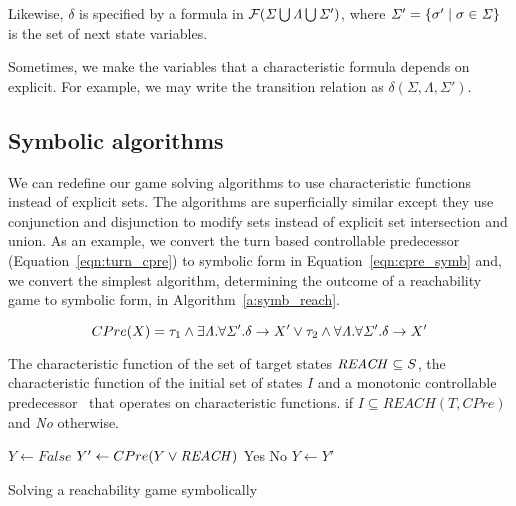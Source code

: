Likewise, $\delta$ is specified by a formula in $\mathcal{F}(\mathit{\Sigma} \bigcup \mathit{\Lambda} \bigcup \mathit{\Sigma}')$, where $\mathit{\Sigma}' = \{\sigma' \mid \sigma \in \mathit{\Sigma} \}$ is the set of next state variables.

Sometimes, we make the variables that a characteristic formula depends on explicit. For example, we may write the transition relation as $\delta(\Sigma, \Lambda, \Sigma')$.

\subsection{Symbolic algorithms}

We can redefine our game solving algorithms to use characteristic functions instead of explicit sets. The algorithms are superficially similar except they use conjunction and disjunction to modify sets instead of explicit set intersection and union. As an example, we convert the turn based controllable predecessor (Equation~\ref{eqn:turn_cpre}) to symbolic form in Equation~\ref{eqn:cpre_symb} and, we convert the simplest algorithm, determining the outcome of a reachability game to symbolic form, in Algorithm~\ref{a:symb_reach}.

\begin{equation}
CPre(X) = \tau_1 \wedge \exists \mathit{\Lambda}. \forall \mathit{\Sigma}'. \delta \rightarrow X' \vee \tau_2 \wedge \forall \mathit{\Lambda}. \forall \mathit{\Sigma}'. \delta \rightarrow X' 
\label{eqn:cpre_symb}
\end{equation}

\begin{algorithm}
\begin{algorithmic}

\Require The characteristic function of the set of target states $\mathit{REACH} \subseteq S$, the characteristic function of the initial set of states $I$ and a monotonic controllable predecessor \cpre\ that operates on characteristic functions.
 if $I \subseteq REACH(T, CPre)$ and {\it No} otherwise.

    \State $Y \gets False$
    \Loop
        \State $Y' \gets CPre(Y \vee \mathit{REACH})$
                \State\Return Yes
            \Else
                \State\Return No
            \EndIf
        \EndIf
        \State $Y \gets Y'$
    \EndLoop
\EndFunction

\end{algorithmic}
\caption{Solving a reachability game symbolically}
\label{a:symb_reach}
\end{algorithm}

